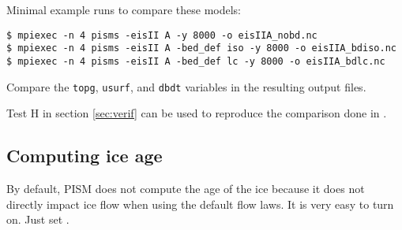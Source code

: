 Minimal example runs to compare these models:
\begin{verbatim}
$ mpiexec -n 4 pisms -eisII A -y 8000 -o eisIIA_nobd.nc
$ mpiexec -n 4 pisms -eisII A -bed_def iso -y 8000 -o eisIIA_bdiso.nc
$ mpiexec -n 4 pisms -eisII A -bed_def lc -y 8000 -o eisIIA_bdlc.nc
\end{verbatim}
Compare the \texttt{topg}, \texttt{usurf}, and \texttt{dbdt} variables in the resulting output files.

Test H in section \ref{sec:verif} can be used to reproduce the comparison done in \cite{BLKfastearth}.


\subsection{Computing ice age} \label{subsect:age}

By default, PISM does not compute the age of the ice because it does not directly impact ice flow when using the default flow laws. It is very easy to turn on.  Just set .



